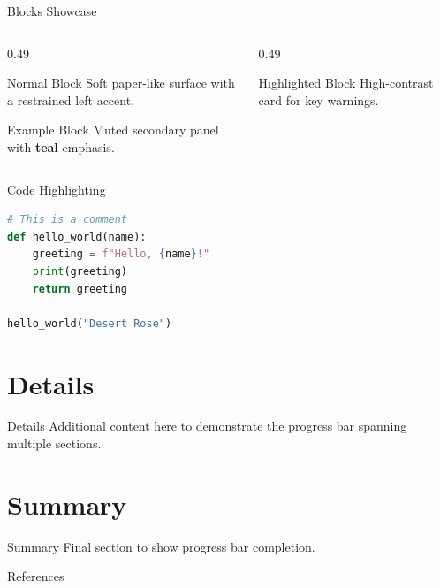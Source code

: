 \documentclass[aspectratio=169]{beamer}
\newcommand{\empteal}[1]{\textbf{\color{w-teal}#1}}
\begin{document}
\begin{frame}[t]{Blocks Showcase}
    \small
    \begin{columns}[t,onlytextwidth]
        \begin{column}{0.49\textwidth}
            \begin{block}{Normal Block}
                Soft paper-like surface with a restrained left accent.
            \end{block}
            \begin{exampleblock}{Example Block}
                Muted secondary panel with \empteal{teal} emphasis.
            \end{exampleblock}
        \end{column}
        \begin{column}{0.49\textwidth}
            \begin{alertblock}{Highlighted Block}
                High-contrast card for key warnings.
            \end{alertblock}
        \end{column}
    \end{columns}
\end{frame}

\begin{frame}[fragile]{Code Highlighting}
    \begin{lstlisting}[language=Python, caption={Python Example}]
# This is a comment
def hello_world(name):
    greeting = f"Hello, {name}!"
    print(greeting)
    return greeting

hello_world("Desert Rose")
    \end{lstlisting}
\end{frame}

\section{Details}
\begin{frame}{Details}
    Additional content here to demonstrate the progress bar
    spanning multiple sections.
\end{frame}

\section{Summary}
\begin{frame}{Summary}
    Final section to show progress bar completion.
\end{frame}

\begin{frame}{References}
    \printbibliography
\end{frame}
\end{document}
